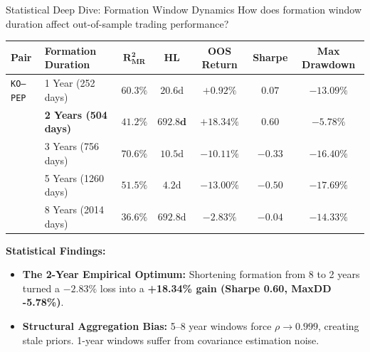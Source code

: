 \documentclass[10pt, aspectratio=169]{beamer}
\begin{document}
\begin{frame}{Statistical Deep Dive: Formation Window Dynamics}
  How does formation window duration affect out-of-sample trading performance?
  \vspace{4pt}
  \begin{table}
    \centering\small
    \begin{tabular}{@{}llccccc@{}}
      \toprule
      \textbf{Pair} & \textbf{Formation Duration} & $\bm{R^2_{\text{MR}}}$ & $\bm{HL}$ & \textbf{OOS Return} & \textbf{Sharpe} & \textbf{Max Drawdown} \\
      \midrule
      \texttt{KO--PEP} & 1 Year (252 days) & $60.3\%$ & $20.6\text{d}$ & $+0.92\%$ & $0.07$ & $-13.09\%$ \\
      & \rowcolor{posgreen!15}\textbf{2 Years (504 days)} & $\mathbf{41.2\%}$ & $\mathbf{692.8\text{d}}$ & $\mathbf{+18.34\%}$ & $\mathbf{0.60}$ & $\mathbf{-5.78\%}$ \\
      & 3 Years (756 days) & $70.6\%$ & $10.5\text{d}$ & $-10.11\%$ & $-0.33$ & $-16.40\%$ \\
      & 5 Years (1260 days) & $51.5\%$ & $4.2\text{d}$ & $-13.00\%$ & $-0.50$ & $-17.69\%$ \\
      & 8 Years (2014 days) & $36.6\%$ & $692.8\text{d}$ & $-2.83\%$ & $-0.04$ & $-14.33\%$ \\
      \bottomrule
    \end{tabular}
  \end{table}
  \vspace{4pt}
  \textbf{Statistical Findings:}
  \begin{itemize}
    \item \textbf{The 2-Year Empirical Optimum:} Shortening formation from 8 to 2 years turned a $-2.83\%$ loss into a \textbf{+18.34\% gain (Sharpe 0.60, MaxDD -5.78\%)}.
    \item \textbf{Structural Aggregation Bias:} 5--8 year windows force $\rho \to 0.999$, creating stale priors. 1-year windows suffer from covariance estimation noise.
  \end{itemize}
\end{frame}
\end{document}

